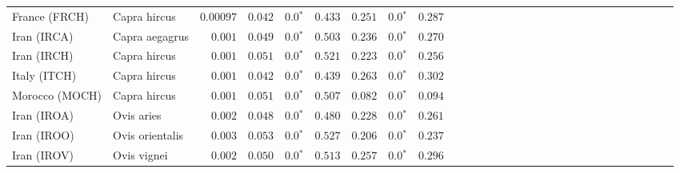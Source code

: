 \begin{center}
\begin{adjustbox}{width = 1\textwidth}
\begin{tabular}{|l|l|r|r|r|r|r|r|r|r|r|r|r|r|r|r|r|r|r|r|r|r|r|r|r|r|r|r|r|}
                  France (FRCH) &         Capra hircus &          $0.00097$ &                      $ 0.042$ &                  $\bm{0.0{^*}}$ &                                           $ 0.433$ &                      $ 0.251$ &                  $\bm{0.0{^*}}$ &                                           $ 0.287$ \\
                    Iran (IRCA) &       Capra aegagrus &           $ 0.001$ &                      $ 0.049$ &                  $\bm{0.0{^*}}$ &                                           $ 0.503$ &                      $ 0.236$ &                  $\bm{0.0{^*}}$ &                                           $ 0.270$ \\
                    Iran (IRCH) &         Capra hircus &           $ 0.001$ &                      $ 0.051$ &                  $\bm{0.0{^*}}$ &                                           $ 0.521$ &                      $ 0.223$ &                  $\bm{0.0{^*}}$ &                                           $ 0.256$ \\
                   Italy (ITCH) &         Capra hircus &           $ 0.001$ &                      $ 0.042$ &                  $\bm{0.0{^*}}$ &                                           $ 0.439$ &                      $ 0.263$ &                  $\bm{0.0{^*}}$ &                                           $ 0.302$ \\
                 Morocco (MOCH) &         Capra hircus &           $ 0.001$ &                      $ 0.051$ &                  $\bm{0.0{^*}}$ &                                           $ 0.507$ &                      $ 0.082$ &                  $\bm{0.0{^*}}$ &                                           $ 0.094$ \\
                    Iran (IROA) &           Ovis aries &           $ 0.002$ &                      $ 0.048$ &                  $\bm{0.0{^*}}$ &                                           $ 0.480$ &                      $ 0.228$ &                  $\bm{0.0{^*}}$ &                                           $ 0.261$ \\
                    Iran (IROO) &      Ovis orientalis &           $ 0.003$ &                      $ 0.053$ &                  $\bm{0.0{^*}}$ &                                           $ 0.527$ &                      $ 0.206$ &                  $\bm{0.0{^*}}$ &                                           $ 0.237$ \\
                    Iran (IROV) &          Ovis vignei &           $ 0.002$ &                      $ 0.050$ &                  $\bm{0.0{^*}}$ &                                           $ 0.513$ &                      $ 0.257$ &                  $\bm{0.0{^*}}$ &                                           $ 0.296$ \\

\end{tabular}
\end{adjustbox}
\end{center}
